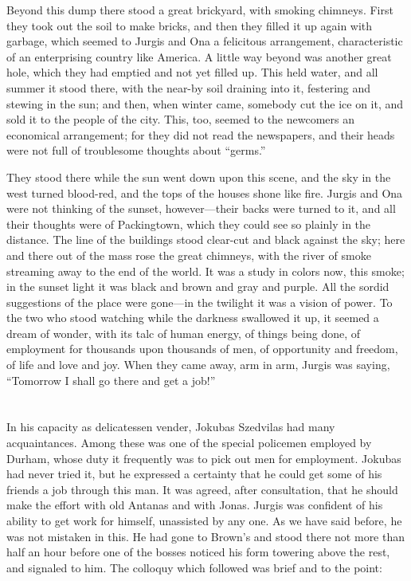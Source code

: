 \documentclass[
]{article}
\begin{document}
Beyond this dump there stood a great brickyard, with smoking chimneys. First they took out the soil to make bricks, and then they filled it up again with garbage, which seemed to Jurgis and Ona a felicitous arrangement, characteristic of an enterprising country like America. A little way beyond was another great hole, which they had emptied and not yet filled up. This held water, and all summer it stood there, with the near-by soil draining into it, festering and stewing in the sun; and then, when winter came, somebody cut the ice on it, and sold it to the people of the city. This, too, seemed to the newcomers an economical arrangement; for they did not read the newspapers, and their heads were not full of troublesome thoughts about ``germs.''

They stood there while the sun went down upon this scene, and the sky in the west turned blood-red, and the tops of the houses shone like fire. Jurgis and Ona were not thinking of the sunset, however---their backs were turned to it, and all their thoughts were of Packingtown, which they could see so plainly in the distance. The line of the buildings stood clear-cut and black against the sky; here and there out of the mass rose the great chimneys, with the river of smoke streaming away to the end of the world. It was a study in colors now, this smoke; in the sunset light it was black and brown and gray and purple. All the sordid suggestions of the place were gone---in the twilight it was a vision of power. To the two who stood watching while the darkness swallowed it up, it seemed a dream of wonder, with its talc of human energy, of things being done, of employment for thousands upon thousands of men, of opportunity and freedom, of life and love and joy. When they came away, arm in arm, Jurgis was saying, ``Tomorrow I shall go there and get a job!''

\section{}\label{section-2}

In his capacity as delicatessen vender, Jokubas Szedvilas had many acquaintances. Among these was one of the special policemen employed by Durham, whose duty it frequently was to pick out men for employment. Jokubas had never tried it, but he expressed a certainty that he could get some of his friends a job through this man. It was agreed, after consultation, that he should make the effort with old Antanas and with Jonas. Jurgis was confident of his ability to get work for himself, unassisted by any one. As we have said before, he was not mistaken in this. He had gone to Brown's and stood there not more than half an hour before one of the bosses noticed his form towering above the rest, and signaled to him. The colloquy which followed was brief and to the point:
\end{document}
